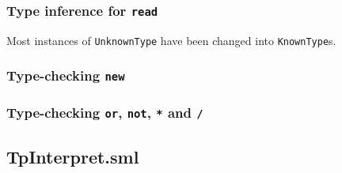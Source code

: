 \documentclass{article}
\begin{document}
\begin{appendix}
\subsubsection{Type inference for \texttt{read}}
Most instances of \texttt{UnknownType} have been changed into \texttt{KnownType}s.
    
\subsubsection{Type-checking \texttt{new}}
    
\subsubsection{Type-checking \texttt{or}, \texttt{not}, \texttt{*} and \texttt{/}}
    
    

\subsection{TpInterpret.sml}
    
    
    
    
\end{appendix}
\end{document}
